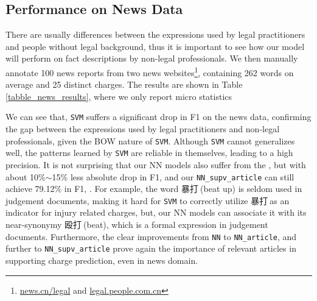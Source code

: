 \subsection{Performance on News Data}
There are usually 
differences between the expressions used by legal practitioners and people without legal background, 
thus it is important to see how our model will perform on fact descriptions  by non-legal professionals.
%
We then manually annotate 100 news reports %
from two news websites\footnote{\url{news.cn/legal} and \url{legal.people.com.cn}},
containing 262 words on average and 25 distinct charges.
%
The results are shown in Table \ref{tabble_news_results}, where we only report micro statistics 

We can see that, \texttt{SVM} suffers a significant drop in F1 on the news data, %
confirming the gap between the expressions used by legal practitioners and non-legal professionals,
given the BOW nature of \texttt{SVM}.
Although \texttt{SVM} cannot generalizes well, the patterns learned by \texttt{SVM} are reliable in themselves, leading to a high precision.
It is not surprising that our NN models also suffer from the , but with about 10\%$\sim$15\% less absolute drop in F1, and our  \texttt{NN\_supv\_article} can still achieve 79.12\% in F1, .
For example, the word 暴打$\ $(beat up) is seldom used in judgement documents,
making it hard for \texttt{SVM} to correctly utilize  暴打$\ $as an indicator for injury related charges, but, %
our NN models can associate it with its  near-synonymy  殴打$\ $(beat), which is a formal expression in judgement documents.
Furthermore, the clear improvements from \texttt{NN} to \texttt{NN\_article}, and further to \texttt{NN\_supv\_article} prove again the importance of relevant articles 
in supporting charge prediction, even in news domain.

